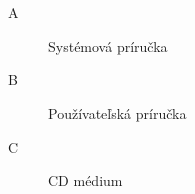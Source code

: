 
\chapter*{\appendixlistname}

\begin{description}
	\item[\appendixname{} A] Systémová príručka
    \item[\appendixname{} B] Používateľská príručka
    \item[\appendixname{} C] CD médium
\end{description}
